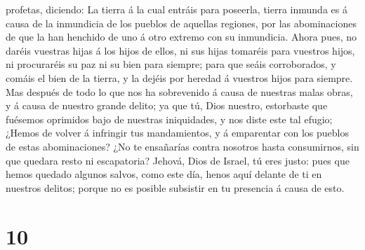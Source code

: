 profetas, diciendo: La tierra á la cual entráis para poseerla, tierra
inmunda es á causa de la inmundicia de los pueblos de aquellas regiones,
por las abominaciones de que la han henchido de uno á otro extremo con
su inmundicia.  Ahora pues, no daréis vuestras hijas á los
hijos de ellos, ni sus hijas tomaréis para vuestros hijos, ni
procuraréis su paz ni su bien para siempre; para que seáis corroborados,
y comáis el bien de la tierra, y la dejéis por heredad á vuestros hijos
para siempre.  Mas después de todo lo que nos ha
sobrevenido á causa de nuestras malas obras, y á causa de nuestro grande
delito; ya que tú, Dios nuestro, estorbaste que fuésemos oprimidos bajo
de nuestras iniquidades, y nos diste este tal efugio; 
¿Hemos de volver á infringir tus mandamientos, y á emparentar con los
pueblos de estas abominaciones? ¿No te ensañarías contra nosotros hasta
consumirnos, sin que quedara resto ni escapatoria?  Jehová,
Dios de Israel, tú eres justo: pues que hemos quedado algunos salvos,
como este día, henos aquí delante de ti en nuestros delitos; porque no
es posible subsistir en tu presencia á causa de esto.

\hypertarget{section-9}{%
\section{10}\label{section-9}}

